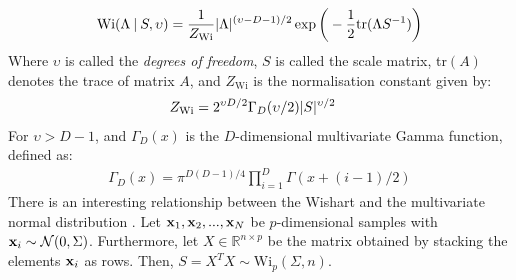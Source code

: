 \documentclass[../main.tex]{subfiles}
\begin{document}
\begin{align*}
\text{Wi}(\Lambda \:\vert\: S, \upsilon) = \frac{1}{Z_{\text{Wi}}} \lvert\Lambda\rvert^{(\upsilon -D -1)/2}\exp{\bigg(-\frac{1}{2}\text{tr}(\Lambda S^{-1})\bigg)}
\end{align*}
Where $\upsilon$ is called the \emph{degrees of freedom}, $S$ is called the scale matrix, tr$(A)$ denotes the trace of matrix $A$, and $Z_{\text{Wi}}$ is the normalisation constant given by:
\begin{align*}
Z_{\text{Wi}} &= 2^{\upsilon D / 2}\Gamma_D(\upsilon/2)\lvert S\rvert^{\upsilon/2}
\end{align*}
For $\upsilon > D-1$, and $\Gamma_D(x)$ is the $D$-dimensional multivariate Gamma function, defined as:
\begin{align*}
\Gamma_D(x) = \pi^{D(D-1)/4}\prod_{i=1}^D\Gamma(x+(i-1)/2)
\end{align*}
There is an interesting relationship between the Wishart and the multivariate normal distribution \cite{Nydick2012}. Let $\mathbf{x}_1, \mathbf{x}_2, ..., \mathbf{x}_N$ be $p$-dimensional samples with $\mathbf{x}_i \sim \mathcal{N}(0, \Sigma)$. Furthermore, let $X \in \mathbb{R}^{n \times p}$ be the matrix obtained by stacking the elements $\mathbf{x}_i$ as rows. Then, $S = X^TX \sim \text{Wi}_p(\Sigma, n)$. 
\end{document}
